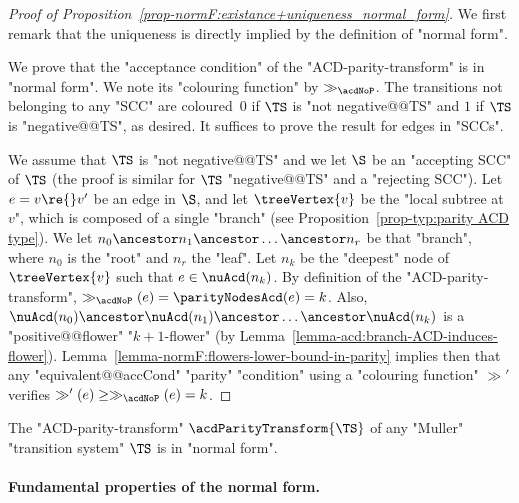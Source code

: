 \documentclass{theoretics}
\begin{document}
\begin{proof}[Proof of Proposition~\ref{prop-normF:existance+uniqueness_normal_form}]
	We first remark that the uniqueness is directly implied by the definition of "normal form".
	
	We prove that the "acceptance condition" of the "ACD-parity-transform"  is in "normal form". We note its "colouring function" by $\gg_{\acdNoP}$.
	The transitions not belonging to any "SCC" are coloured~$0$ if $\TS$ is "not negative@@TS" and $1$ if $\TS$ is "negative@@TS", as desired. It suffices to prove the result for edges in "SCCs".
	
	We assume that $\TS$ is "not negative@@TS" and 
	we let $\S$ be an "accepting SCC" of $\TS$ (the proof is similar for $\TS$ "negative@@TS" and a "rejecting SCC"). %
	Let $e=v\re{}v'$ be an edge in $\S$, and let $\treeVertex{v}$ be the "local subtree at $v$", which is composed of a single "branch" (see Proposition~\ref{prop-typ:parity ACD type}). We let $n_0\ancestor n_1 \ancestor\dots \ancestor n_r$ be that "branch", where $n_0$ is the "root" and $n_r$ the "leaf". Let $n_k$ be the "deepest" node of $\treeVertex{v}$ such that $e\in \nuAcd(n_k)$. By definition of the "ACD-parity-transform", $\gg_{\acdNoP}(e) = \parityNodesAcd(e) = k$. Also, $\nuAcd(n_0)\ancestor \nuAcd(n_1) \ancestor\dots \ancestor \nuAcd(n_k)$ is a "positive@@flower" "$k+1$-flower" (by Lemma~\ref{lemma-acd:branch-ACD-induces-flower}).
	Lemma~\ref{lemma-normF:flowers-lower-bound-in-parity} implies then that any "equivalent@@accCond" "parity" "condition" using a "colouring function" $\gg'$ verifies $\gg'(e)\geq \gg_{\acdNoP}(e)=k$. 
\end{proof}


\begin{corollary}\label{cor-normF:ACD-transform_normal_form}
	The "ACD-parity-transform" $\acdParityTransform{\TS}$ of any "Muller" "transition system" $\TS$ is in "normal form". %
\end{corollary}



\paragraph*{Fundamental properties of the normal form.}
\end{document}
